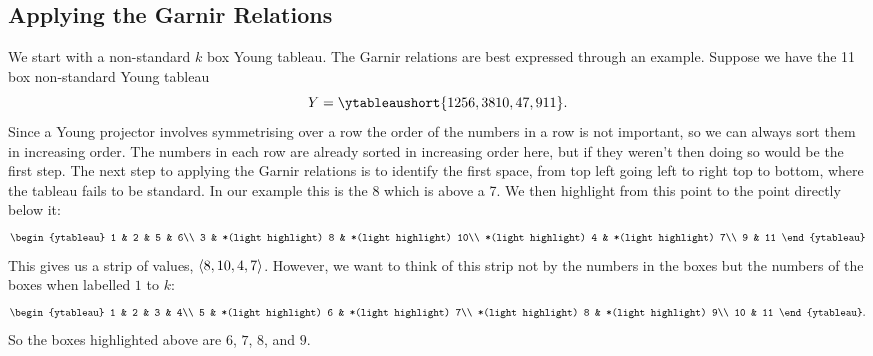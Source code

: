\documentclass[fleqn]{NotesClass}
\DeclarePairedDelimiter{\tuple}{\langle}{\rangle}
\begin{document}
    \subsection{Applying the Garnir Relations}
    We start with a non-standard \(k\) box Young tableau.
    The Garnir relations are best expressed through an example.
    Suppose we have the 11 box non-standard Young tableau
    \begin{equation}
        Y = \ytableaushort{1256,38{10},47,9{11}}.
    \end{equation}
    Since a Young projector involves symmetrising over a row the order of the numbers in a row is not important, so we can always sort them in increasing order.
    The numbers in each row are already sorted in increasing order here, but if they weren't then doing so would be the first step.
    The next step to applying the Garnir relations is to identify the first space, from top left going left to right top to bottom, where the tableau fails to be standard.
    In our example this is the 8 which is above a 7.
    We then highlight from this point to the point directly below it:
    \begin{equation}
        \begin{ytableau}
            1 & 2 & 5 & 6\\
            3 & *(light highlight) 8 & *(light highlight) 10\\
            *(light highlight) 4 & *(light highlight) 7\\
            9 & 11
        \end{ytableau}
    \end{equation}
    This gives us a strip of values, \(\tuple{8,10,4,7}\).
    However, we want to think of this strip not by the numbers in the boxes but the numbers of the boxes when labelled \(1\) to \(k\):
    \begin{equation}
        \begin{ytableau}
            1 & 2 & 3 & 4\\
            5 & *(light highlight) 6 & *(light highlight) 7\\
            *(light highlight) 8 & *(light highlight) 9\\
            10 & 11
        \end{ytableau}
        .
    \end{equation}
    So the boxes highlighted above are \(6\), \(7\), \(8\), and \(9\).
    
\end{document}

